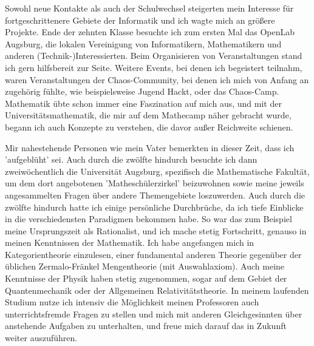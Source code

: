 \documentclass{scrartcl}
\begin{document}
Sowohl neue Kontakte als auch der Schulwechsel steigerten mein Interesse für fortgeschrittenere Gebiete der Informatik
und ich wagte mich an größere Projekte. Ende der zehnten Klasse besuchte ich zum ersten Mal das OpenLab Augsburg,
die lokalen Vereinigung von Informatikern, Mathematikern und anderen (Technik-)Interessierten. Beim Organisieren
von Veranstaltungen stand ich gern hilfsbereit zur Seite.
Weitere Events, bei denen ich begeistert teilnahm, waren Veranstaltungen der Chaos-Community, bei denen ich mich
von Anfang an zugehörig fühlte, wie beispielsweise Jugend Hackt, oder das Chaos-Camp. Mathematik übte schon immer
eine Faszination auf mich aus, und mit der Universitätsmathematik, die mir auf dem Mathecamp näher gebracht wurde,
begann ich auch Konzepte zu verstehen, die davor außer Reichweite schienen.

Mir nahestehende Personen wie mein Vater bemerkten in dieser Zeit, dass ich 'aufgeblüht' sei.
Auch durch die zwölfte hindurch besuchte ich dann zweiwöchentlich die Universität Augsburg, spezifisch die
Mathematische Fakultät, um dem dort angebotenen ’Matheschülerzirkel’ beizuwohnen sowie meine jeweils angesammelten
Fragen über andere Themengebiete loszuwerden. Auch durch die zwölfte hindurch hatte ich einige persönliche Durchbrüche,
da ich tiefe Einblicke in die verschiedensten Paradigmen bekommen habe. So war das zum Beispiel meine Ursprungszeit
als Rationalist, und ich mache stetig Fortschritt, genauso in meinen Kenntnissen der Mathematik.
Ich habe angefangen mich in Kategorientheorie einzulesen, einer fundamental anderen Theorie gegenüber der üblichen
Zermalo-Fränkel Mengentheorie (mit Auswahlaxiom). Auch meine Kenntnisse der Physik haben stetig zugenommen,
sogar auf dem Gebiet der Quantenmechanik oder der Allgemeinen Relativitätstheorie. In meinem laufenden Studium
nutze ich intensiv die Möglichkeit meinen Professoren auch unterrichtsfremde Fragen zu stellen und mich mit
anderen Gleichgesinnten über anstehende Aufgaben zu unterhalten, und freue mich darauf das in Zukunft weiter auszuführen.
\end{document}
